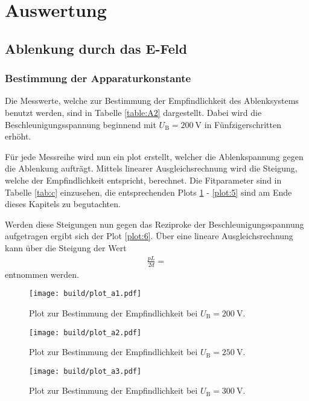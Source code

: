 \section{Auswertung}
\label{sec:Auswertung}


\subsection{Ablenkung durch das E-Feld}

\subsubsection{Bestimmung der Apparaturkonstante}



Die Messwerte, welche zur Bestimmung der Empfindlichkeit des Ablenksystems benutzt werden, sind in Tabelle \ref{table:A2} dargestellt.
Dabei wird die Beschleunigungsspannung beginnend mit $U_{\text{B}} = \SI{200}{\volt}$ in Fünfzigerschritten erhöht.

Für jede Messreihe wird nun ein plot erstellt, welcher die Ablenkspannung gegen die Ablenkung aufträgt.
Mittels linearer Ausgleichsrechnung wird die Steigung, welche der Empfindlichkeit entspricht, berechnet.
Die Fitparameter sind in Tabelle \ref{tab:c} einzusehen, die entsprechenden Plots \ref{plot:1} - \ref{plot:5} sind am Ende dieses Kapitels zu begutachten.

Werden diese Steigungen nun gegen das Reziproke der Beschleunigungsspannung aufgetragen ergibt sich der Plot \ref{plot:6}.
Über eine lineare Ausgleichsrechnung kann über die Steigung der Wert
\begin{align*}
  \frac{pL}{2d} = 
\end{align*}
entnommen werden.

\begin{figure}
  \centering
  \texttt{[image: build/plot\_a1.pdf]}
  \caption{Plot zur Bestimmung der Empfindlichkeit bei $U_{\text{B}} = \SI{200}{\volt}$.}
  \label{plot:1}
\end{figure}

\begin{figure}
  \centering
  \texttt{[image: build/plot\_a2.pdf]}
  \caption{Plot zur Bestimmung der Empfindlichkeit bei $U_{\text{B}} = \SI{250}{\volt}$.}
  \label{plot:2}
\end{figure}

\begin{figure}
  \centering
  \texttt{[image: build/plot\_a3.pdf]}
  \caption{Plot zur Bestimmung der Empfindlichkeit bei $U_{\text{B}} = \SI{300}{\volt}$.}
  \label{plot:3}
\end{figure}

